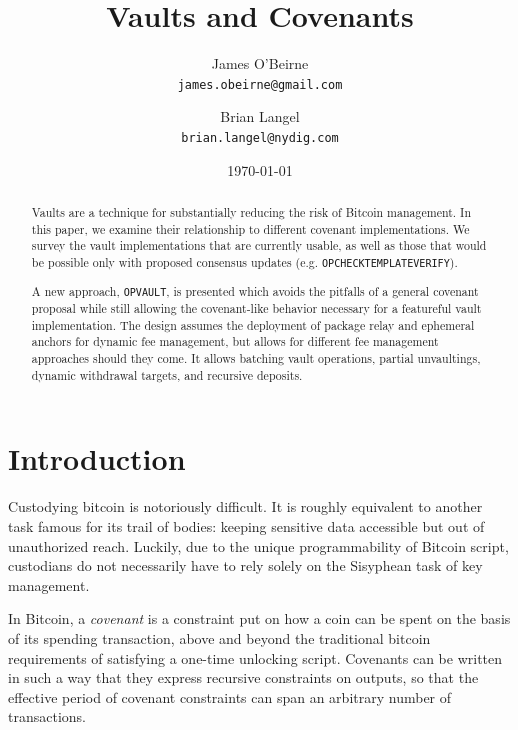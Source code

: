 \documentclass[10pt]{article}
\author{James O'Beirne \\
  \texttt{james.obeirne@gmail.com}
\and
  Brian Langel \\
  \texttt{brian.langel@nydig.com} \\}
\date{\today}
\title{Vaults and Covenants}
\begin{document}
\newcommand{\ctv}{\texttt{OP\textunderscore{}CHECKTEMPLATEVERIFY}}
\newcommand{\opv}{\texttt{OP\textunderscore{}VAULT}}
\newcommand{\opuv}{\texttt{OP\textunderscore{}UNVAULT}}
\newcommand{\spk}{\code{scriptPubKey}}
\newcommand{\code}[1]{\texttt{#1}}


\maketitle
\begin{abstract}

  Vaults are a technique for substantially reducing the risk of Bitcoin management. In
  this paper, we examine their relationship to different covenant implementations. We
  survey the vault implementations that are currently usable, as well as those that
  would be possible only with proposed consensus updates (e.g. \ctv{}). 

  A new approach, \opv{}, is presented which avoids the pitfalls of a general
  covenant proposal while still allowing the covenant-like behavior necessary for a
  featureful vault implementation. The design assumes the deployment of package relay
  and ephemeral anchors for dynamic fee management, but allows for different fee
  management approaches should they come. It allows batching vault operations, partial
  unvaultings, dynamic withdrawal targets, and recursive deposits.

\end{abstract}

\section*{Introduction}

Custodying bitcoin is notoriously difficult. It is roughly equivalent to
another task famous for its trail of bodies: keeping sensitive data accessible but out
of unauthorized reach. Luckily, due to the unique programmability of Bitcoin script,
custodians do not necessarily have to rely solely on the Sisyphean task of key
management.

In Bitcoin, a \emph{covenant} is a constraint put on how a coin can be spent on the
basis of its spending transaction, above and beyond the traditional bitcoin
requirements of satisfying a one-time unlocking script. Covenants can be written in
such a way that they express recursive constraints on outputs, so that the effective
period of covenant constraints can span an arbitrary number of transactions. 
\end{document}
